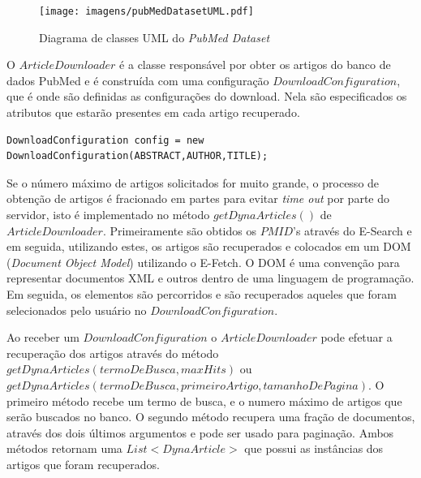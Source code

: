 \begin{landscape}
\begin{figure}[h!]
    \center    
    \texttt{[image: imagens/pubMedDatasetUML.pdf]}
    \caption{Diagrama de classes UML do \emph{PubMed Dataset} \label{fig:pubMedDatasetUML}}
\end{figure}
\end{landscape}

O  $ArticleDownloader$ é a classe responsável por obter os artigos do banco de dados PubMed e é construída com uma configuração $DownloadConfiguration$, que é onde são definidas as configurações do download. Nela são especificados os atributos que estarão presentes em cada artigo recuperado.

\begin{lstlisting}
DownloadConfiguration config = new DownloadConfiguration(ABSTRACT,AUTHOR,TITLE);
\end{lstlisting}

 Se o número máximo de artigos solicitados for muito grande, o processo de obtenção de artigos é fracionado em partes para evitar \emph{time out} por parte do servidor, isto é implementado no método $getDynaArticles()$ de $ArticleDownloader$. Primeiramente são obtidos os $PMID$’s através do E-Search e em seguida, utilizando estes, os artigos são recuperados e colocados em um DOM (\emph{Document Object Model}) utilizando o E-Fetch. O DOM é uma convenção para representar documentos XML e outros dentro de uma linguagem de programação. Em seguida, os elementos são percorridos e são
recuperados aqueles que foram selecionados pelo usuário no $DownloadConfiguration$.

Ao receber um $DownloadConfiguration$ o $ArticleDownloader$ pode efetuar a recuperação dos artigos através do método $getDynaArticles(termoDeBusca, maxHits)$ ou $getDynaArticles(termoDeBusca, primeiroArtigo, tamanhoDePagina)$. O primeiro método recebe um termo de busca, e o numero máximo de artigos que serão buscados no banco. O segundo método recupera uma fração de documentos, através dos dois últimos argumentos e pode ser usado para paginação. Ambos métodos retornam uma $List<DynaArticle>$ que possui as instâncias dos artigos que foram recuperados.

